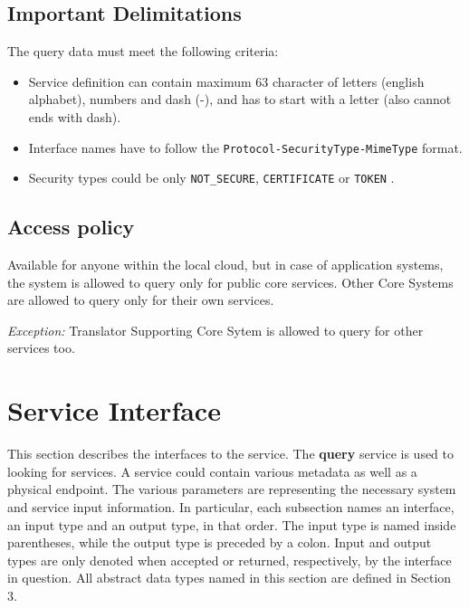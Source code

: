 \documentclass[a4paper]{arrowhead}
\begin{document}
\clearpage

\subsection{Important Delimitations}
\label{sec:delimitations}

The query data must meet the following criteria:

\begin{itemize}
    \item Service definition can contain maximum 63 character of letters (english alphabet), numbers and dash (-), and has to start with a letter (also cannot ends with dash).
    \item Interface names have to follow the \texttt{Protocol-SecurityType-MimeType} format.
    \item Security types could be only \texttt{NOT\_SECURE}, \texttt{CERTIFICATE} or \texttt{TOKEN} .
\end{itemize}

\subsection{Access policy}
\label{sec:accesspolicy}

Available for anyone within the local cloud, but in case of application systems, the system is allowed to query only for public core services. Other Core Systems are allowed to query only for their own services.

\textit{Exception:} Translator Supporting Core Sytem is allowed to query for other services too.

\newpage

\section{Service Interface}
\label{sec:functions}

This section describes the interfaces to the service. The \textbf{query} service is used to looking for services. A service could contain various metadata as well as a physical endpoint. The various parameters are representing the necessary system and service input information.
In particular, each subsection names an interface, an input type and an output type, in that order.
The input type is named inside parentheses, while the output type is preceded by a colon.
Input and output types are only denoted when accepted or returned, respectively, by the interface in question. All abstract data types named in this section are defined in Section 3.
\end{document}
